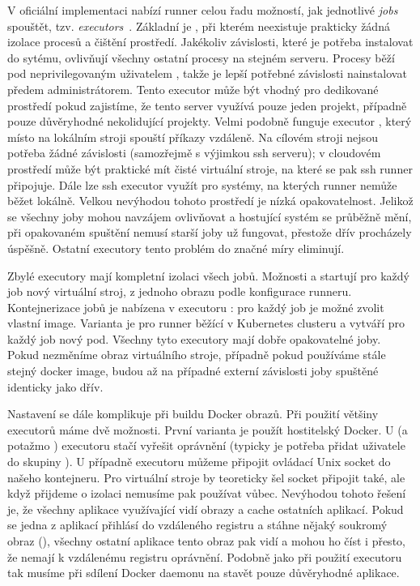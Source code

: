         \label{gitlab-executor}
        V oficiální implementaci nabízí runner celou řadu možností, jak jednotlivé \textit{jobs} spouštět, tzv. \textit{executors}~\cite{gitlab-runner-config}. Základní je , při kterém neexistuje prakticky žádná izolace procesů a čištění prostředí. Jakékoliv závislosti, které je potřeba instalovat do sytému, ovlivňují všechny ostatní procesy na stejném serveru. Procesy běží pod neprivilegovaným uživatelem , takže je lepší potřebné závislosti nainstalovat předem administrátorem. Tento executor může být vhodný pro dedikované prostředí pokud zajistíme, že tento server využívá pouze jeden projekt, případně pouze důvěryhodné nekolidující projekty. Velmi podobně funguje executor , který místo na lokálním stroji spouští příkazy vzdáleně. Na cílovém stroji nejsou potřeba žádné závislosti (samozřejmě s výjimkou ssh serveru); v cloudovém prostředí může být praktické mít čisté virtuální stroje, na které se pak ssh runner připojuje. Dále lze ssh executor využít pro systémy, na kterých runner nemůže běžet lokálně. Velkou nevýhodou tohoto prostředí je nízká opakovatelnost. Jelikož se všechny joby mohou navzájem ovlivňovat a hostující systém se průběžně mění, při opakovaném spuštění nemusí starší joby už fungovat, přestože dřív procházely úspěšně. Ostatní executory tento problém do značné míry eliminují.

        Zbylé executory mají kompletní izolaci všech jobů. Možnosti  a  startují pro každý job nový virtuální stroj, z jednoho obrazu podle konfigurace runneru. Kontejnerizace jobů je nabízena v executoru : pro každý job je možné zvolit vlastní image. Varianta  je pro runner běžící v Kubernetes clusteru a vytváří pro každý job nový pod. Všechny tyto executory mají dobře opakovatelné joby. Pokud nezměníme obraz virtuálního stroje, případně pokud používáme stále stejný docker image, budou až na případné externí závislosti joby spuštěné identicky jako dřív.

        \label{sec:gitlab-ci-docker}
        Nastavení \CI se dále komplikuje při buildu Docker obrazů. Při použití většiny executorů máme dvě možnosti. První varianta je použít hostitelský Docker. U  (a potažmo ) executoru stačí vyřešit oprávnění (typicky je potřeba přidat uživatele  do skupiny ). U  případně  executoru můžeme připojit ovládací Unix socket  do našeho kontejneru. Pro virtuální stroje by teoreticky šel socket připojit také, ale když přijdeme o izolaci nemusíme pak  používat vůbec. Nevýhodou tohoto řešení je, že všechny aplikace využívající \CI vidí obrazy a cache ostatních aplikací. Pokud se jedna z aplikací přihlásí do vzdáleného registru a stáhne nějaký soukromý obraz (), všechny ostatní aplikace tento obraz pak vidí a mohou ho číst i přesto, že nemají k vzdálenému registru oprávnění. Podobně jako při použití  executoru tak musíme při sdílení Docker daemonu na \CI stavět pouze důvěryhodné aplikace.

